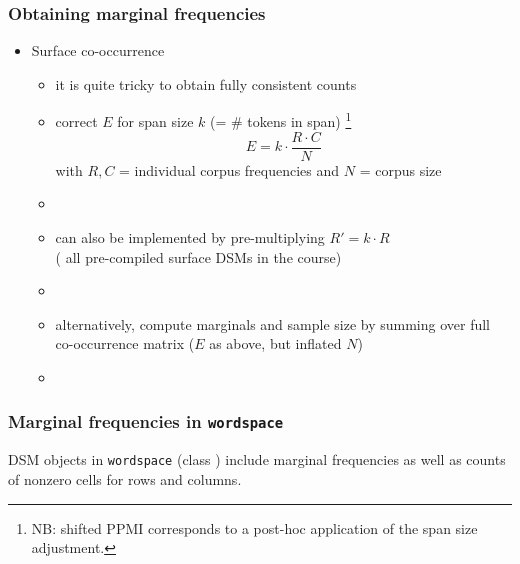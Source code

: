 \documentclass[t]{beamer} %
\begin{document}
\begin{frame}
  \frametitle{Obtaining marginal frequencies \citep{Evert:08}}

  \begin{itemize}
  \item Surface co-occurrence
    \begin{itemize}
    \item it is quite tricky to obtain fully consistent counts \citep{Evert:04phd}
    \item {} correct $E$ for span size $k$ (= \# tokens in span)%
      \footnote{NB: shifted PPMI \citep{Levy:Goldberg:14} corresponds to a post-hoc application of the span size adjustment. }
      \[
      E = k\cdot \frac{R\cdot C}{N}
      \]
      with $R, C$ = individual corpus frequencies and $N$ = corpus size
    \item[]
    \pause
    \item can also be implemented by pre-multiplying $R' = k\cdot R$\\
      (\hand{} all pre-compiled surface DSMs in the course)
    \item[]
    \item alternatively, compute marginals and sample size by summing
      over full co-occurrence matrix (\so $E$ as above, but inflated $N$)
    \item[]
    \end{itemize}
  \end{itemize}
\end{frame}

\begin{frame}[fragile]
  \frametitle{Marginal frequencies in \texttt{wordspace}}
  
  DSM objects in \texttt{wordspace} (class ) include marginal frequencies as well as
  counts of nonzero cells for rows and columns.
\end{frame}
\end{document}
